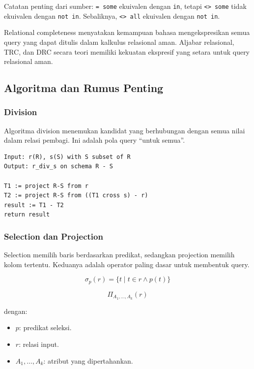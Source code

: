 Catatan penting dari sumber: \texttt{= some} ekuivalen dengan \texttt{in}, tetapi \texttt{<> some} tidak ekuivalen dengan \texttt{not in}. Sebaliknya, \texttt{<> all} ekuivalen dengan \texttt{not in}.

Relational completeness menyatakan kemampuan bahasa mengekspresikan semua query yang dapat ditulis dalam kalkulus relasional aman. Aljabar relasional, TRC, dan DRC secara teori memiliki kekuatan ekspresif yang setara untuk query relasional aman.

\subsection{Algoritma dan Rumus Penting}

\subsubsection{Division}

\begin{jawab}
Algoritma division menemukan kandidat yang berhubungan dengan semua nilai dalam relasi pembagi. Ini adalah pola query ``untuk semua''.
\end{jawab}

\begin{lstlisting}[caption={Pseudocode division relational algebra}, label={lst:division-ra}]
Input: r(R), s(S) with S subset of R
Output: r_div_s on schema R - S

T1 := project R-S from r
T2 := project R-S from ((T1 cross s) - r)
result := T1 - T2
return result
\end{lstlisting}

\subsubsection{Selection dan Projection}

\begin{jawab}
Selection memilih baris berdasarkan predikat, sedangkan projection memilih kolom tertentu. Keduanya adalah operator paling dasar untuk membentuk query.
\end{jawab}

\begin{equation}
    \sigma_p(r)=\{t \mid t \in r \land p(t)\}
    \label{eq:selection-formula}
\end{equation}

\begin{equation}
    \Pi_{A_1,\ldots,A_k}(r)
    \label{eq:projection-formula}
\end{equation}

dengan:
\begin{itemize}
    \item \(p\): predikat seleksi.
    \item \(r\): relasi input.
    \item \(A_1,\ldots,A_k\): atribut yang dipertahankan.
\end{itemize}
